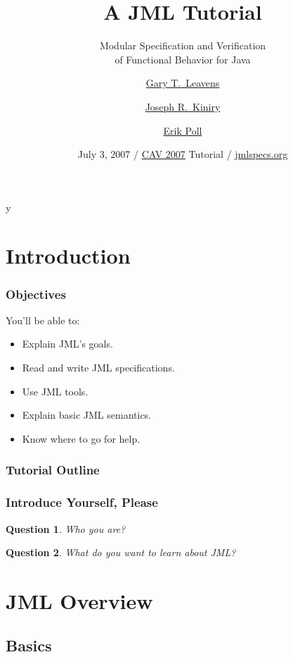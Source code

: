 \if y\MAKEHANDOUTS \documentclass[compress,landscape,handout]{beamer}
\title[JML Tutorial]{A JML Tutorial}
\subtitle{Modular Specification and Verification \\
of Functional Behavior for Java}
\author[Gary T. Leavens] %
{\href{http://www.cs.iastate.edu/~leavens/}{Gary T.~Leavens}\inst{1}
  \and \href{http://secure.ucd.ie/~kiniry/}{Joseph R.~Kiniry}\inst{2}
  \and \href{http://www.cs.ru.nl/~erikpoll/}{Erik Poll}\inst{3}}
\institute[ISU] %
{
  \inst{1}%
  Department of Computer Science\\
  \href{http://www.cs.iastate.edu/}{Iowa State University} (moving to \href{http://www.eecs.ucf.edu}{University of Central Florida})
  \and
  \inst{2}%
  School of Computer Science and Informatics \\
  \href{http://csiweb.ucd.ie/}{University College Dublin}
  \and
  \inst{3}%
  Computing Science Department \\
  \href{http://www.cs.ru.nl/}{Radboud University Nijmegen}
}
\date[CAV 2007]{July 3, 2007 / \href{http://cav2007.org/}{CAV 2007} Tutorial / \href{http://www.jmlspecs.org}{jmlspecs.org}}
\newtheorem*{question}{Question}
\begin{document}
\begin{frame}
  \titlepage
\end{frame}

\section*{Introduction}

\begin{frame}
\frametitle{Objectives}

You'll be able to:
  \begin{itemize}
  \item
    Explain JML's goals.
  \item
    Read and write JML specifications.
  \item
    Use JML tools.
  \item
    Explain basic JML semantics.
  \item
    Know where to go for help.
  \end{itemize}
\end{frame}

\begin{frame}
\frametitle{Tutorial Outline}
  \tableofcontents[hideallsubsections] %
\end{frame}

\begin{frame}
\frametitle{Introduce Yourself, Please}

\begin{question}
Who you are?
\end{question}

\begin{question}
What do you want to learn about JML?
\end{question}
\end{frame}


\section{JML Overview}

\subsection[Basics]{Basics}
\end{document}
